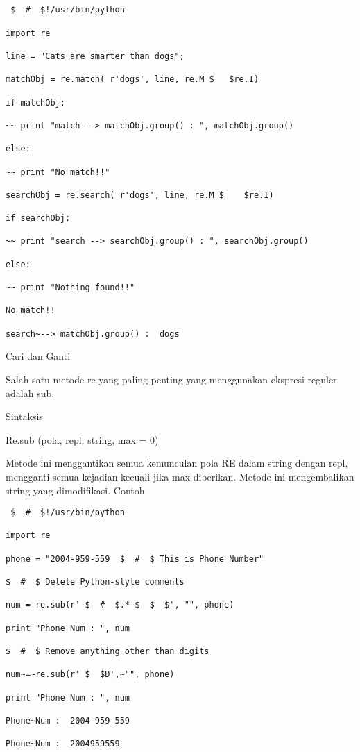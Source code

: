 \begin {enumerate}
\begin {enumerate}
\begin{verbatim}


 $  #  $!/usr/bin/python

import re

line = "Cats are smarter than dogs";

matchObj = re.match( r'dogs', line, re.M $   $re.I)

if matchObj:

~~ print "match --> matchObj.group() : ", matchObj.group()

else:

~~ print "No match!!"

searchObj = re.search( r'dogs', line, re.M $    $re.I)

if searchObj:

~~ print "search --> searchObj.group() : ", searchObj.group()

else:

~~ print "Nothing found!!"

No match!!

search~--> matchObj.group() :  dogs
\end{verbatim}

Cari dan Ganti

Salah satu metode re yang paling penting yang menggunakan ekspresi reguler adalah sub.

Sintaksis

Re.sub (pola, repl, string, max = 0)

Metode ini menggantikan semua kemunculan pola RE dalam string dengan repl, mengganti semua kejadian kecuali jika max diberikan. Metode ini mengembalikan string yang dimodifikasi.
Contoh
\begin{verbatim}
 $  #  $!/usr/bin/python

import re

phone = "2004-959-559  $  #  $ This is Phone Number"

$  #  $ Delete Python-style comments

num = re.sub(r' $  #  $.* $  $  $', "", phone)

print "Phone Num : ", num

$  #  $ Remove anything other than digits

num~=~re.sub(r' $  $D',~"", phone)

print "Phone Num : ", num

Phone~Num :  2004-959-559

Phone~Num :  2004959559
\end{verbatim}


\end{enumerate}
\end{enumerate}
